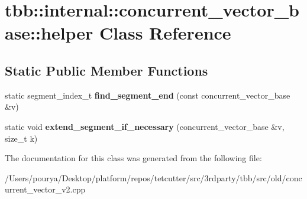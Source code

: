 \hypertarget{classtbb_1_1internal_1_1concurrent__vector__base_1_1helper}{}\section{tbb\+:\+:internal\+:\+:concurrent\+\_\+vector\+\_\+base\+:\+:helper Class Reference}
\label{classtbb_1_1internal_1_1concurrent__vector__base_1_1helper}
\subsection*{Static Public Member Functions}
\begin{DoxyCompactItemize}
\item 
\hypertarget{classtbb_1_1internal_1_1concurrent__vector__base_1_1helper_aa6732bd0d7b2435b8f20c26168f93ddf}{}static segment\+\_\+index\+\_\+t {\bfseries find\+\_\+segment\+\_\+end} (const concurrent\+\_\+vector\+\_\+base \&v)\label{classtbb_1_1internal_1_1concurrent__vector__base_1_1helper_aa6732bd0d7b2435b8f20c26168f93ddf}

\item 
\hypertarget{classtbb_1_1internal_1_1concurrent__vector__base_1_1helper_a89526ac0c653ba05bb40cc12a435012d}{}static void {\bfseries extend\+\_\+segment\+\_\+if\+\_\+necessary} (concurrent\+\_\+vector\+\_\+base \&v, size\+\_\+t k)\label{classtbb_1_1internal_1_1concurrent__vector__base_1_1helper_a89526ac0c653ba05bb40cc12a435012d}

\end{DoxyCompactItemize}


The documentation for this class was generated from the following file\+:\begin{DoxyCompactItemize}
\item 
/\+Users/pourya/\+Desktop/platform/repos/tetcutter/src/3rdparty/tbb/src/old/concurrent\+\_\+vector\+\_\+v2.\+cpp\end{DoxyCompactItemize}
